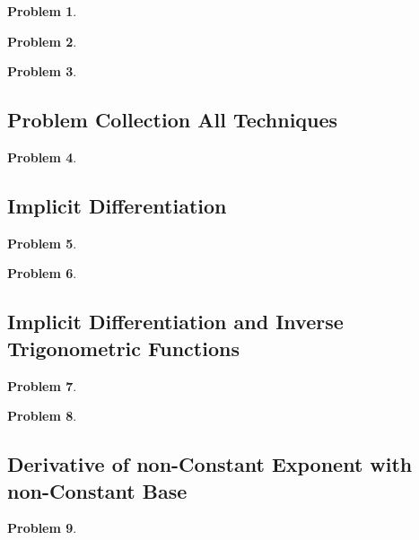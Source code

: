 \documentclass{article}
\newtheorem{problem}{Problem}
\begin{document}
\begin{problem}

\end{problem}


\begin{problem}

\end{problem}
\begin{problem}

\end{problem}
\subsection{Problem Collection All Techniques}
\begin{problem}

\end{problem}


\subsection{Implicit Differentiation}\label{secMPSImplicitDifferentiation}
\begin{problem}

\end{problem}
\begin{problem}

\end{problem}


\subsection{Implicit Differentiation and Inverse Trigonometric Functions}
\begin{problem}

\end{problem}
\begin{problem}

\end{problem}


\subsection{Derivative of non-Constant Exponent with non-Constant Base}\label{secMPSDerivativeNonConstExponent}
\begin{problem}

\end{problem}

\end{document}
